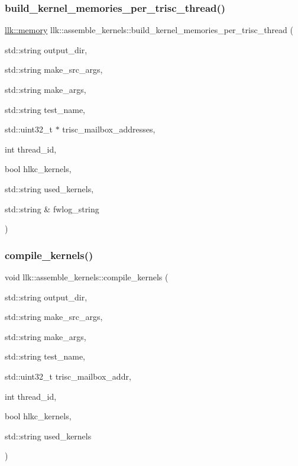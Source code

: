 \subsubsection{\texorpdfstring{build\+\_\+kernel\+\_\+memories\+\_\+per\+\_\+trisc\+\_\+thread()}{build\_kernel\_memories\_per\_trisc\_thread()}}
{\footnotesize\ttfamily \hyperlink{classllk_1_1memory}{llk\+::memory} llk\+::assemble\+\_\+kernels\+::build\+\_\+kernel\+\_\+memories\+\_\+per\+\_\+trisc\+\_\+thread (\begin{DoxyParamCaption}\item[{std\+::string}]{output\+\_\+dir,  }\item[{std\+::string}]{make\+\_\+src\+\_\+args,  }\item[{std\+::string}]{make\+\_\+args,  }\item[{std\+::string}]{test\+\_\+name,  }\item[{std\+::uint32\+\_\+t $\ast$}]{trisc\+\_\+mailbox\+\_\+addresses,  }\item[{int}]{thread\+\_\+id,  }\item[{bool}]{hlkc\+\_\+kernels,  }\item[{std\+::string}]{used\+\_\+kernels,  }\item[{std\+::string \&}]{fwlog\+\_\+string }\end{DoxyParamCaption})}

\mbox{\label{namespacellk_1_1assemble__kernels_ac86be485d5e20c3e05809d2f00e63cfd}} 
\subsubsection{\texorpdfstring{compile\+\_\+kernels()}{compile\_kernels()}}
{\footnotesize\ttfamily void llk\+::assemble\+\_\+kernels\+::compile\+\_\+kernels (\begin{DoxyParamCaption}\item[{std\+::string}]{output\+\_\+dir,  }\item[{std\+::string}]{make\+\_\+src\+\_\+args,  }\item[{std\+::string}]{make\+\_\+args,  }\item[{std\+::string}]{test\+\_\+name,  }\item[{std\+::uint32\+\_\+t}]{trisc\+\_\+mailbox\+\_\+addr,  }\item[{int}]{thread\+\_\+id,  }\item[{bool}]{hlkc\+\_\+kernels,  }\item[{std\+::string}]{used\+\_\+kernels }\end{DoxyParamCaption})}

